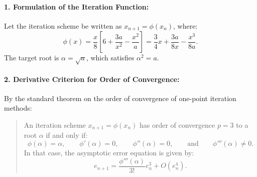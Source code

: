 \documentclass[11pt,a4paper]{article}
\begin{document}
\paragraph{1. Formulation of the Iteration Function:}
Let the iteration scheme be written as $x_{n+1} = \phi(x_n)$, where:
\[
\phi(x) = \frac{x}{8}\left[6 + \frac{3a}{x^2} - \frac{x^2}{a}\right] = \frac{3}{4}x + \frac{3a}{8x} - \frac{x^3}{8a}.
\]
The target root is $\alpha = \sqrt{a}$, which satisfies $\alpha^2 = a$.

\paragraph{2. Derivative Criterion for Order of Convergence:}
By the standard theorem on the order of convergence of one-point iteration methods:
\begin{quote}
An iteration scheme $x_{n+1} = \phi(x_n)$ has order of convergence $p = 3$ to a root $\alpha$ if and only if:
\[
\phi(\alpha) = \alpha, \qquad \phi'(\alpha) = 0, \qquad \phi''(\alpha) = 0, \qquad \text{and} \qquad \phi'''(\alpha) \neq 0.
\]
In that case, the asymptotic error equation is given by:
\[
e_{n+1} = \frac{\phi'''(\alpha)}{3!} e_n^3 + O(e_n^4).
\]
\end{quote}
\end{document}
